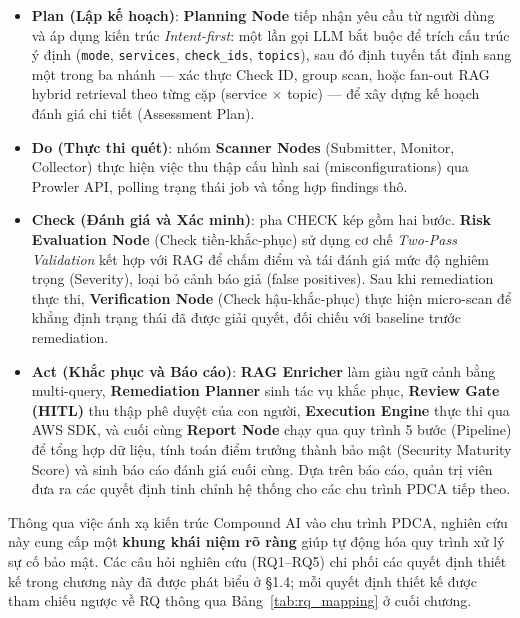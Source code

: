 \begin{itemize}
  \item \textbf{Plan (Lập kế hoạch)}: \textbf{Planning Node} tiếp nhận yêu cầu từ người dùng và áp dụng kiến trúc \textit{Intent-first}: một lần gọi LLM bắt buộc để trích cấu trúc ý định (\texttt{mode}, \texttt{services}, \texttt{check\_ids}, \texttt{topics}), sau đó định tuyến tất định sang một trong ba nhánh --- xác thực Check ID, group scan, hoặc fan-out RAG hybrid retrieval theo từng cặp (service $\times$ topic) --- để xây dựng kế hoạch đánh giá chi tiết (Assessment Plan).

  \item \textbf{Do (Thực thi quét)}: nhóm \textbf{Scanner Nodes} (Submitter, Monitor, Collector) thực hiện việc thu thập cấu hình sai (misconfigurations) qua Prowler API, polling trạng thái job và tổng hợp findings thô.

  \item \textbf{Check (Đánh giá và Xác minh)}: pha CHECK kép gồm hai bước. \textbf{Risk Evaluation Node} (Check tiền-khắc-phục) sử dụng cơ chế \textit{Two-Pass Validation} kết hợp với RAG để chấm điểm và tái đánh giá mức độ nghiêm trọng (Severity), loại bỏ cảnh báo giả (false positives). Sau khi remediation thực thi, \textbf{Verification Node} (Check hậu-khắc-phục) thực hiện micro-scan để khẳng định trạng thái đã được giải quyết, đối chiếu với baseline trước remediation.

  \item \textbf{Act (Khắc phục và Báo cáo)}: \textbf{RAG Enricher} làm giàu ngữ cảnh bằng multi-query, \textbf{Remediation Planner} sinh tác vụ khắc phục, \textbf{Review Gate (HITL)} thu thập phê duyệt của con người, \textbf{Execution Engine} thực thi qua AWS SDK, và cuối cùng \textbf{Report Node} chạy qua quy trình 5 bước (Pipeline) để tổng hợp dữ liệu, tính toán điểm trưởng thành bảo mật (Security Maturity Score) và sinh báo cáo đánh giá cuối cùng. Dựa trên báo cáo, quản trị viên đưa ra các quyết định tinh chỉnh hệ thống cho các chu trình PDCA tiếp theo.
\end{itemize}

Thông qua việc ánh xạ kiến trúc Compound AI vào chu trình PDCA, nghiên cứu này cung cấp một \textbf{khung khái niệm rõ ràng} giúp tự động hóa quy trình xử lý sự cố bảo mật. Các câu hỏi nghiên cứu (RQ1--RQ5) chi phối các quyết định thiết kế trong chương này đã được phát biểu ở \S{}1.4; mỗi quyết định thiết kế được tham chiếu ngược về RQ thông qua Bảng~\ref{tab:rq_mapping} ở cuối chương.

